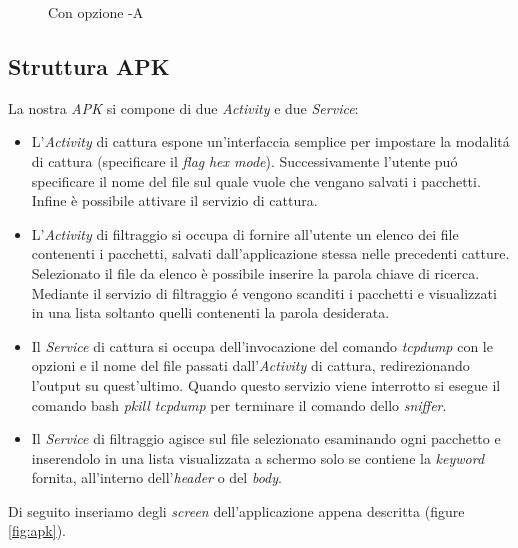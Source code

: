 \documentclass[12pt]{article} %
\begin{document}
\begin{figure}[H] %
\caption{Con opzione -A}\label{fig:A}
\end{figure}

\newpage
\subsection{Struttura APK}
La nostra \textit{APK} si compone di due \textit{Activity} e due \textit{Service}:

\begin{itemize}
\item L'\textit{Activity} di cattura espone un'interfaccia semplice per impostare la modalit\'a di cattura (specificare il \textit{flag} \textit{hex mode}). Successivamente l'utente pu\'o specificare il nome del file sul quale vuole che vengano salvati i pacchetti. Infine è possibile attivare il servizio di cattura.
\item L'\textit{Activity} di filtraggio si occupa di fornire all'utente un elenco dei file contenenti i pacchetti, salvati dall'applicazione stessa nelle precedenti catture. Selezionato il file da elenco è possibile inserire la parola chiave di ricerca. Mediante il servizio di filtraggio \'e vengono scanditi i pacchetti e visualizzati in una lista soltanto quelli contenenti la parola desiderata.
\item Il \textit{Service} di cattura si occupa dell'invocazione del comando \textit{tcpdump} con le opzioni e il nome del file passati dall'\textit{Activity} di cattura, redirezionando l'output su quest'ultimo. Quando questo servizio viene interrotto si esegue il comando bash \textit{pkill tcpdump} per terminare il comando dello \textit{sniffer}. 
\item Il \textit{Service} di filtraggio agisce sul file selezionato esaminando ogni pacchetto e inserendolo in una lista visualizzata a schermo solo se contiene la \textit{keyword} fornita, all'interno dell'\textit{header} o del \textit{body}.
\end{itemize}
 
Di seguito inseriamo degli \textit{screen} dell'applicazione appena descritta (figure \ref{fig:apk}).
 
\end{document}
